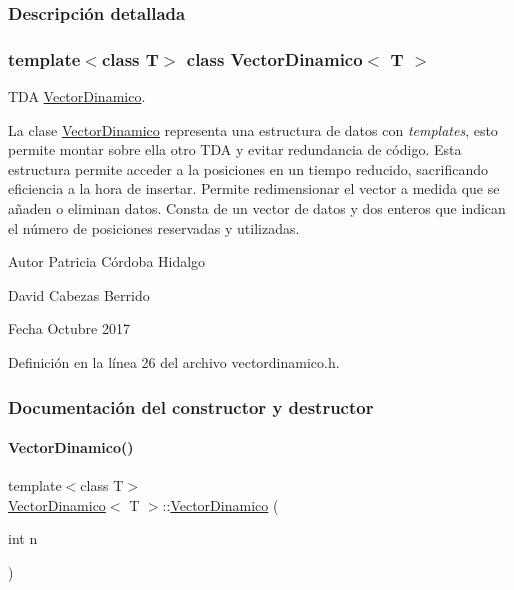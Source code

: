 \subsubsection{Descripción detallada}
\subsubsection*{template$<$class T$>$\newline
class Vector\+Dinamico$<$ T $>$}

T\+DA \hyperlink{classVectorDinamico}{Vector\+Dinamico}. 

La clase {\ttfamily \hyperlink{classVectorDinamico}{Vector\+Dinamico}} representa una estructura de datos con {\itshape templates}, esto permite montar sobre ella otro T\+DA y evitar redundancia de código. Esta estructura permite acceder a la posiciones en un tiempo reducido, sacrificando eficiencia a la hora de insertar. Permite redimensionar el vector a medida que se añaden o eliminan datos. Consta de un vector de datos y dos enteros que indican el número de posiciones reservadas y utilizadas.

\begin{DoxyAuthor}{Autor}
Patricia Córdoba Hidalgo 

David Cabezas Berrido 
\end{DoxyAuthor}
\begin{DoxyDate}{Fecha}
Octubre 2017 
\end{DoxyDate}


Definición en la línea 26 del archivo vectordinamico.\+h.



\subsubsection{Documentación del constructor y destructor}
\mbox{\label{classVectorDinamico_a034f346c2349584dfa2bb89a296f7e2e}} 
\paragraph{\texorpdfstring{Vector\+Dinamico()}{VectorDinamico()}\hspace{0.1cm}{\footnotesize\ttfamily [1/2]}}
{\footnotesize\ttfamily template$<$class T$>$ \\
\hyperlink{classVectorDinamico}{Vector\+Dinamico}$<$ T $>$\+::\hyperlink{classVectorDinamico}{Vector\+Dinamico} (\begin{DoxyParamCaption}\item[{int}]{n }\end{DoxyParamCaption})}



